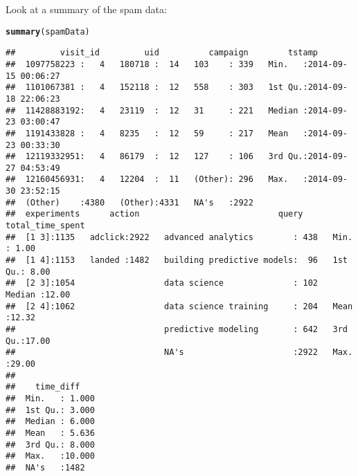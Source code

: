 \documentclass{article}\usepackage[]{graphicx}\usepackage[]{color}
\makeatletter
\newcommand{\hlstd}[1]{\textcolor[rgb]{0.345,0.345,0.345}{#1}}%
\newcommand{\hlkwd}[1]{\textcolor[rgb]{0.737,0.353,0.396}{\textbf{#1}}}%
\newenvironment{kframe}{%
 \def\at@end@of@kframe{}%
 \ifinner\ifhmode%
  \def\at@end@of@kframe{\end{minipage}}%
  \begin{minipage}{\columnwidth}%
 \fi\fi%
 \def\FrameCommand##1{\hskip\@totalleftmargin \hskip-\fboxsep
 \colorbox{shadecolor}{##1}\hskip-\fboxsep
     \hskip-\linewidth \hskip-\@totalleftmargin \hskip\columnwidth}%
 \MakeFramed {\advance\hsize-\width
   \@totalleftmargin\z@ \linewidth\hsize
   \@setminipage}}%
 {\par\unskip\endMakeFramed%
 \at@end@of@kframe}
\newenvironment{knitrout}{}{} %
\makeatother
\begin{document}
Look at a summary of the spam data:
\begin{knitrout}
\color{fgcolor}\begin{kframe}
\begin{alltt}
\hlkwd{summary}\hlstd{(spamData)}
\end{alltt}
\begin{verbatim}
##         visit_id         uid          campaign        tstamp                   
##  1097758223 :   4   180718 :  14   103    : 339   Min.   :2014-09-15 00:06:27  
##  1101067381 :   4   152118 :  12   558    : 303   1st Qu.:2014-09-18 22:06:23  
##  11428883192:   4   23119  :  12   31     : 221   Median :2014-09-23 03:00:47  
##  1191433828 :   4   8235   :  12   59     : 217   Mean   :2014-09-23 00:33:30  
##  12119332951:   4   86179  :  12   127    : 106   3rd Qu.:2014-09-27 04:53:49  
##  12160456931:   4   12204  :  11   (Other): 296   Max.   :2014-09-30 23:52:15  
##  (Other)    :4380   (Other):4331   NA's   :2922                                
##  experiments      action                            query      total_time_spent
##  [1 3]:1135   adclick:2922   advanced analytics        : 438   Min.   : 1.00   
##  [1 4]:1153   landed :1482   building predictive models:  96   1st Qu.: 8.00   
##  [2 3]:1054                  data science              : 102   Median :12.00   
##  [2 4]:1062                  data science training     : 204   Mean   :12.32   
##                              predictive modeling       : 642   3rd Qu.:17.00   
##                              NA's                      :2922   Max.   :29.00   
##                                                                                
##    time_diff     
##  Min.   : 1.000  
##  1st Qu.: 3.000  
##  Median : 6.000  
##  Mean   : 5.636  
##  3rd Qu.: 8.000  
##  Max.   :10.000  
##  NA's   :1482
\end{verbatim}
\end{kframe}
\end{knitrout}
\end{document}

